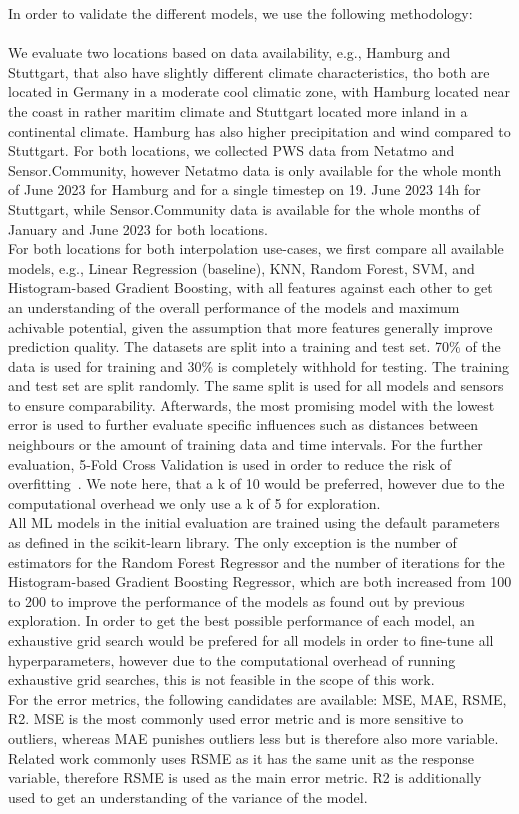 In order to validate the different models, we use the following methodology:\\
\\
We evaluate two locations based on data availability, e.g., Hamburg and Stuttgart, that also have slightly different climate characteristics, tho both are located in Germany in a moderate cool climatic zone, with Hamburg located near the coast in rather maritim climate and Stuttgart located more inland in a continental climate. Hamburg has also higher precipitation and wind compared to Stuttgart.
For both locations, we collected PWS data from Netatmo and Sensor.Community, however Netatmo data is only available for the whole month of June 2023 for Hamburg and for a single timestep on 19. June 2023 14h for Stuttgart, while Sensor.Community data is available for the whole months of January and June 2023 for both locations.\\
For both locations for both interpolation use-cases, we first compare all available models, e.g., Linear Regression (baseline), KNN, Random Forest, SVM, and Histogram-based Gradient Boosting, with all features against each other to get an understanding of the overall performance of the models and maximum achivable potential, given the assumption that more features generally improve prediction quality. The datasets are split into a training and test set. 70\% of the data is used for training and 30\% is completely withhold for testing. The training and test set are split randomly. The same split is used for all models and sensors to ensure comparability.
Afterwards, the most promising model with the lowest error is used to further evaluate specific influences such as distances between neighbours or the amount of training data and time intervals. For the further evaluation, 5-Fold Cross Validation is used in order to reduce the risk of overfitting~\cite{kohavi1995study}. We note here, that a k of 10 would be preferred, however due to the computational overhead we only use a k of 5 for exploration.\\
All ML models in the initial evaluation are trained using the default parameters as defined in the scikit-learn library. The only exception is the number of estimators for the Random Forest Regressor and the number of iterations for the Histogram-based Gradient Boosting Regressor, which are both increased from 100 to 200 to improve the performance of the models as found out by previous exploration. In order to get the best possible performance of each model, an exhaustive grid search would be prefered for all models in order to fine-tune all hyperparameters, however due to the computational overhead of running exhaustive grid searches, this is not feasible in the scope of this work.\\
For the error metrics, the following candidates are available: MSE, MAE, RSME, R2. MSE is the most commonly used error metric and is more sensitive to outliers, whereas MAE punishes outliers less but is therefore also more variable. Related work commonly uses RSME as it has the same unit as the response variable, therefore RSME is used as the main error metric. R2 is additionally used to get an understanding of the variance of the model.

